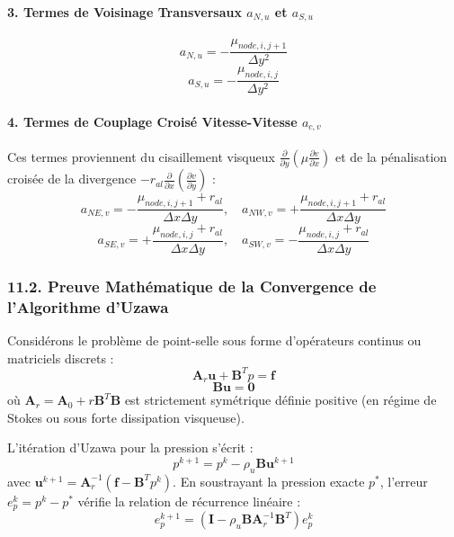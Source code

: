 \documentclass[
  french,
]{article}
\begin{document}
\paragraph{\texorpdfstring{3. Termes de Voisinage Transversaux
\(a_{N, u}\) et
\(a_{S, u}\)}{3. Termes de Voisinage Transversaux a\_\{N, u\} et a\_\{S, u\}}}\label{termes-de-voisinage-transversaux-a_n-u-et-a_s-u}

\[a_{N, u} = - \frac{\mu_{node, i, j+1}}{\Delta y^2}\]
\[a_{S, u} = - \frac{\mu_{node, i, j}}{\Delta y^2}\]

\paragraph{\texorpdfstring{4. Termes de Couplage Croisé Vitesse-Vitesse
\(a_{c, v}\)}{4. Termes de Couplage Croisé Vitesse-Vitesse a\_\{c, v\}}}\label{termes-de-couplage-croisuxe9-vitesse-vitesse-a_c-v}

Ces termes proviennent du cisaillement visqueux
\(\frac{\partial}{\partial y}\left( \mu \frac{\partial v}{\partial x} \right)\)
et de la pénalisation croisée de la divergence
\(-r_{al} \frac{\partial}{\partial x}\left( \frac{\partial v}{\partial y} \right)\)
:
\[a_{NE, v} = - \frac{\mu_{node, i, j+1} + r_{al}}{\Delta x \Delta y}, \quad a_{NW, v} = + \frac{\mu_{node, i, j+1} + r_{al}}{\Delta x \Delta y}\]
\[a_{SE, v} = + \frac{\mu_{node, i, j} + r_{al}}{\Delta x \Delta y}, \quad a_{SW, v} = - \frac{\mu_{node, i, j} + r_{al}}{\Delta x \Delta y}\]

\subsubsection{11.2. Preuve Mathématique de la Convergence de
l'Algorithme
d'Uzawa}\label{preuve-mathuxe9matique-de-la-convergence-de-lalgorithme-duzawa}

Considérons le problème de point-selle sous forme d'opérateurs continus
ou matriciels discrets :
\[\mathbf{A}_r \mathbf{u} + \mathbf{B}^T p = \mathbf{f}\]
\[\mathbf{B} \mathbf{u} = \mathbf{0}\] où
\(\mathbf{A}_r = \mathbf{A}_0 + r \mathbf{B}^T \mathbf{B}\) est
strictement symétrique définie positive (en régime de Stokes ou sous
forte dissipation visqueuse).

L'itération d'Uzawa pour la pression s'écrit :
\[p^{k+1} = p^k - \rho_u \mathbf{B} \mathbf{u}^{k+1}\] avec
\(\mathbf{u}^{k+1} = \mathbf{A}_r^{-1} (\mathbf{f} - \mathbf{B}^T p^k)\).
En soustrayant la pression exacte \(p^*\), l'erreur
\(e_p^k = p^k - p^*\) vérifie la relation de récurrence linéaire :
\[e_p^{k+1} = \left( \mathbf{I} - \rho_u \mathbf{B} \mathbf{A}_r^{-1} \mathbf{B}^T \right) e_p^k\]
\end{document}
